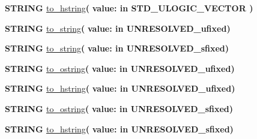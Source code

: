 \begin{DoxyCompactItemize}
{\bfseries {\bfseries \textcolor{comment}{S\+T\+R\+I\+N\+G}\textcolor{vhdlchar}{ }}} \hyperlink{class__fixed__pkg_a8edf96017c02c0534882acdd5058d739}{to\+\_\+hstring}{\bfseries  ( }{\bfseries \textcolor{vhdlchar}{value\+: }\textcolor{stringliteral}{in }{\bfseries \textcolor{comment}{S\+T\+D\+\_\+\+U\+L\+O\+G\+I\+C\+\_\+\+V\+E\+C\+T\+O\+R}\textcolor{vhdlchar}{ }}}{\bfseries  )} 
\item 
{\bfseries {\bfseries \textcolor{comment}{S\+T\+R\+I\+N\+G}\textcolor{vhdlchar}{ }}} \hyperlink{class__fixed__pkg_af56ceef013a6410cf13e94e989da4d33}{to\+\_\+string}{\bfseries  ( }{\bfseries \textcolor{vhdlchar}{value\+: }\textcolor{stringliteral}{in }\textcolor{vhdlchar}{U\+N\+R\+E\+S\+O\+L\+V\+E\+D\+\_\+ufixed}}{\bfseries  )} 
\item 
{\bfseries {\bfseries \textcolor{comment}{S\+T\+R\+I\+N\+G}\textcolor{vhdlchar}{ }}} \hyperlink{class__fixed__pkg_af56ceef013a6410cf13e94e989da4d33}{to\+\_\+string}{\bfseries  ( }{\bfseries \textcolor{vhdlchar}{value\+: }\textcolor{stringliteral}{in }\textcolor{vhdlchar}{U\+N\+R\+E\+S\+O\+L\+V\+E\+D\+\_\+sfixed}}{\bfseries  )} 
\item 
{\bfseries {\bfseries \textcolor{comment}{S\+T\+R\+I\+N\+G}\textcolor{vhdlchar}{ }}} \hyperlink{class__fixed__pkg_aa4e5c418f084f52cb97589cd0ea72a57}{to\+\_\+ostring}{\bfseries  ( }{\bfseries \textcolor{vhdlchar}{value\+: }\textcolor{stringliteral}{in }\textcolor{vhdlchar}{U\+N\+R\+E\+S\+O\+L\+V\+E\+D\+\_\+ufixed}}{\bfseries  )} 
\item 
{\bfseries {\bfseries \textcolor{comment}{S\+T\+R\+I\+N\+G}\textcolor{vhdlchar}{ }}} \hyperlink{class__fixed__pkg_a8edf96017c02c0534882acdd5058d739}{to\+\_\+hstring}{\bfseries  ( }{\bfseries \textcolor{vhdlchar}{value\+: }\textcolor{stringliteral}{in }\textcolor{vhdlchar}{U\+N\+R\+E\+S\+O\+L\+V\+E\+D\+\_\+ufixed}}{\bfseries  )} 
\item 
{\bfseries {\bfseries \textcolor{comment}{S\+T\+R\+I\+N\+G}\textcolor{vhdlchar}{ }}} \hyperlink{class__fixed__pkg_aa4e5c418f084f52cb97589cd0ea72a57}{to\+\_\+ostring}{\bfseries  ( }{\bfseries \textcolor{vhdlchar}{value\+: }\textcolor{stringliteral}{in }\textcolor{vhdlchar}{U\+N\+R\+E\+S\+O\+L\+V\+E\+D\+\_\+sfixed}}{\bfseries  )} 
\item 
{\bfseries {\bfseries \textcolor{comment}{S\+T\+R\+I\+N\+G}\textcolor{vhdlchar}{ }}} \hyperlink{class__fixed__pkg_a8edf96017c02c0534882acdd5058d739}{to\+\_\+hstring}{\bfseries  ( }{\bfseries \textcolor{vhdlchar}{value\+: }\textcolor{stringliteral}{in }\textcolor{vhdlchar}{U\+N\+R\+E\+S\+O\+L\+V\+E\+D\+\_\+sfixed}}{\bfseries  )} 

\end{DoxyCompactItemize}
